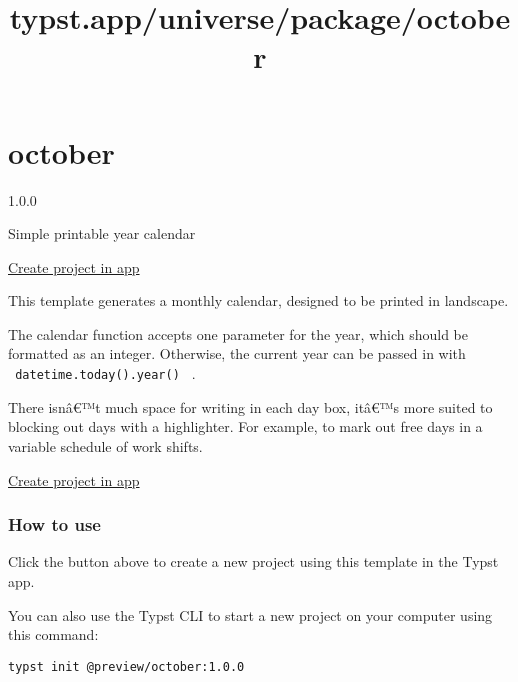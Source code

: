 \title{typst.app/universe/package/october}

\label{banner}
\label{template-thumbnail}

\section{october}\label{october}

{ 1.0.0 }

Simple printable year calendar

\href{/app?template=october&version=1.0.0}{Create project in app}

\label{readme}
This template generates a monthly calendar, designed to be printed in
landscape.

The calendar function accepts one parameter for the year, which should
be formatted as an integer. Otherwise, the current year can be passed in
with \texttt{\ datetime.today().year()\ } .

\begin{Shaded}
\begin{Highlighting}[]
\NormalTok{)}
\end{Highlighting}
\end{Shaded}

There isnâ€™t much space for writing in each day box, itâ€™s more suited
to blocking out days with a highlighter. For example, to mark out free
days in a variable schedule of work shifts.

\href{/app?template=october&version=1.0.0}{Create project in app}

\subsubsection{How to use}\label{how-to-use}

Click the button above to create a new project using this template in
the Typst app.

You can also use the Typst CLI to start a new project on your computer
using this command:

\begin{verbatim}
typst init @preview/october:1.0.0
\end{verbatim}



